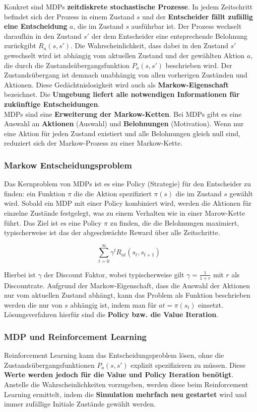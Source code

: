 \documentclass[10pt]{scrartcl}
\begin{document}
Konkret sind MDPs \textbf{zeitdiskrete stochastische Prozesse}. In jedem Zeitschritt befindet sich der Prozess in einem Zustand $s$ und der \textbf{Entscheider fällt zufällig eine Entscheidung} $a$, die im Zustand $s$ ausführbar ist. Der Prozess wechselt daraufhin in den Zustand $s'$ der dem Entscheider eine entsprechende Belohnung zurückgibt $R_{a}(s,s')$. Die Wahrscheinlichkeit, dass dabei in den Zustand $s'$ gewechselt wird ist abhängig vom aktuellen Zustand und der gewählten Aktion $a$, die durch die Zustandsübergangsfunktion $P_{a}(s,s')$ beschrieben wird. Der Zustandsübergang ist demnach unabhängig von allen vorherigen Zuständen und Aktionen. Diese Gedächtnislosigkeit wird auch als \textbf{Markow-Eigenschaft} bezeichnet. Die \textbf{Umgebung liefert alle notwendigen Informationen für zukünftige Entscheidungen}.\\
MDPs sind eine \textbf{Erweiterung der Markow-Ketten}. Bei MDPs gibt es eine Auswahl an \textbf{Aktionen} (Auswahl) und \textbf{Belohnungen} (Motivation). Wenn nur eine Aktion für jeden Zustand existiert und alle Belohnungen gleich null sind, reduziert sich der Markow-Prozess zu einer Markow-Kette.

\subsubsection{Markow Entscheidungsproblem}
Das Kernproblem von MDPs ist es eine Policy (Strategie) für den Entscheider zu finden: ein Funktion $\pi$ die die Aktion spezifiziert $\pi(s)$ die im Zustand $s$ gewählt wird. Sobald ein MDP mit einer Policy kombiniert wird, werden die Aktionen für einzelne Zustände festgelegt, was zu einem Verhalten wie in einer Marow-Kette führt. Das Ziel ist es eine Policy $\pi$ zu finden, die die Belohnungen maximiert, typischerweise ist das der abgeschwächte Reward über alle Zeitschritte.

\begin{equation}
\sum_{t=0}^\infty \gamma^t R_{at}(s_{t}, s_{t+1})
\end{equation}

Hierbei ist $\gamma$ der Discount Faktor, wobei typischerweise gilt $\gamma = \frac{1}{1+r}$ mit $r$ als Discountrate. Aufgrund der Markow-Eigenschaft, dass die Auswahl der Aktionen nur vom aktuellen Zustand abhängt, kann das Problem als Funktion beschrieben werden die nur von $s$ abhängig ist, indem man für $at= \pi(s_{t})$ einsetzt. Lösungsverfahren hierfür sind die \textbf{Policy bzw. die Value Iteration}.

\subsubsection{MDP und Reinforcement Learning}
Reinforcement Learning kann das Entscheidungsproblem lösen, ohne die Zustandsübergangsfunktionen $P_{a}(s,s')$ explizit spezifizieren zu müssen. Diese \textbf{Werte werden jedoch für die Value und Policy Iteration benötigt}.\\
Anstelle die Wahrscheinlichkeiten vorzugeben, werden diese beim Reinforcement Learning ermittelt, indem die \textbf{Simulation mehrfach neu gestartet} wird und immer zufällige Initiale Zustände gewählt werden.
\end{document}
